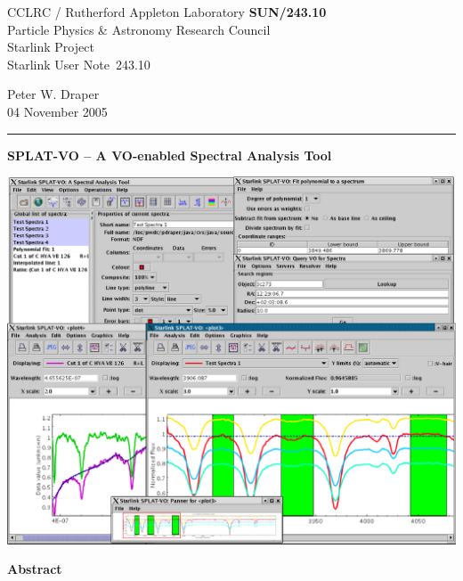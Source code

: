 \documentclass[twoside,11pt]{article}
\newcommand{\stardoccategory}  {Starlink User Note}
\newcommand{\stardocinitials}  {SUN}
\newcommand{\stardocnumber}    {243.10}
\newcommand{\stardocauthors}   {Peter W. Draper}
\newcommand{\stardocdate}      {04 November 2005}
\newcommand{\stardoctitle}     {SPLAT-VO -- A VO-enabled Spectral Analysis Tool}
\newcommand{\stardocname}{\stardocinitials /\stardocnumber}
\newenvironment{latexonly}{}{}
\renewcommand{\_}{\texttt{\symbol{95}}}
\begin{document}
\thispagestyle{empty}

\begin{latexonly}
   CCLRC / Rutherford Appleton Laboratory \hfill \textbf{\stardocname}\\
   {\large Particle Physics \& Astronomy Research Council}\\
   {\large Starlink Project\\}
   {\large \stardoccategory\ \stardocnumber}
   \begin{flushright}
   \stardocauthors\\
   \stardocdate
   \end{flushright}
   \vspace{-4mm}
   \rule{\textwidth}{0.5mm}
   \vspace{5mm}
   \begin{center}
      {\LARGE\textbf{\stardoctitle \\ [2.5ex]}}
   \end{center}
   \vspace{5mm}

\begin{center}
\includegraphics[scale=0.4]{sun243_figures/frontfigure.eps}
\end{center}

   \begin{center}
      {\Large\textbf{Abstract}}
   \end{center}
\end{latexonly}
\end{document}
